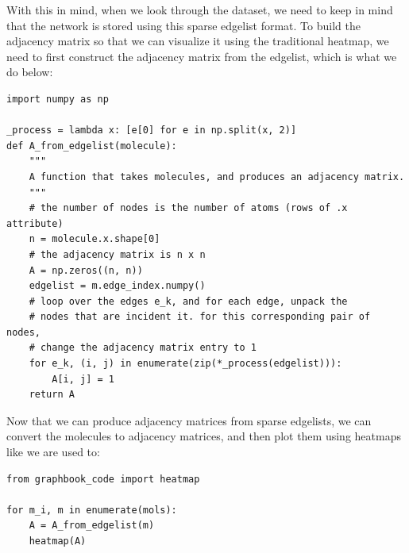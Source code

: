 With this in mind, when we look through the dataset, we need to keep in mind that the network is stored using this sparse edgelist format. To build the adjacency matrix so that we can visualize it using the traditional heatmap, we need to first construct the adjacency matrix from the edgelist, which is what we do below:

\begin{lstlisting}[style=python]
import numpy as np

_process = lambda x: [e[0] for e in np.split(x, 2)]
def A_from_edgelist(molecule):
    """
    A function that takes molecules, and produces an adjacency matrix.
    """
    # the number of nodes is the number of atoms (rows of .x attribute)
    n = molecule.x.shape[0]
    # the adjacency matrix is n x n
    A = np.zeros((n, n))
    edgelist = m.edge_index.numpy()
    # loop over the edges e_k, and for each edge, unpack the 
    # nodes that are incident it. for this corresponding pair of nodes, 
    # change the adjacency matrix entry to 1
    for e_k, (i, j) in enumerate(zip(*_process(edgelist))):
        A[i, j] = 1
    return A
\end{lstlisting}

Now that we can produce adjacency matrices from sparse edgelists, we can convert the molecules to adjacency matrices, and then plot them using heatmaps like we are used to:

\begin{lstlisting}[style=python]
from graphbook_code import heatmap

for m_i, m in enumerate(mols):
    A = A_from_edgelist(m)
    heatmap(A)
\end{lstlisting}

